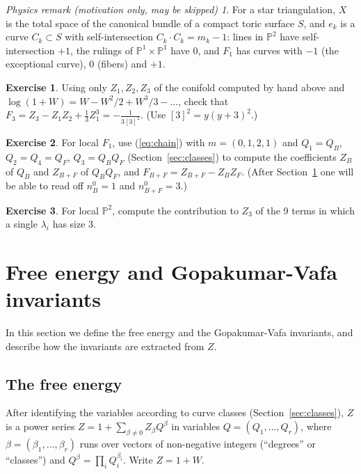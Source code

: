 \documentclass[11pt]{article}
\theoremstyle{plain}
\theoremstyle{definition}
\newtheorem{exercise}{Exercise}[section]
\theoremstyle{remark}
\newtheorem*{physrem}{Physics remark (motivation only, may be skipped)}
\newcommand{\PP}{\mathbb{P}}
\begin{document}
\begin{physrem}
For a star triangulation, $X$ is the total space of the canonical bundle of a compact toric
surface $S$, and $e_k$ is a curve $C_k\subset S$ with self-intersection $C_k\cdot C_k=m_k-1$:
lines in $\PP^2$ have self-intersection $+1$, the rulings of $\PP^1\times\PP^1$ have $0$, and
$F_1$ has curves with $-1$ (the exceptional curve), $0$ (fibers) and $+1$.
\end{physrem}

\begin{exercise}\label{ex:ex1}
Using only $Z_1,Z_2,Z_3$ of the conifold computed by hand above and $\log(1+W)=W-W^2/2+W^3/3-\ldots$,
check that $F_3=Z_3-Z_1Z_2+\frac13Z_1^3=-\frac1{3[3]^2}$. (Use $[3]^2=y(y+3)^2$.)
\end{exercise}

\begin{exercise}\label{ex:ex2}
For local $F_1$, use (\ref{eq:chain}) with $m=(0,1,2,1)$ and $Q_1=Q_B$, $Q_2=Q_4=Q_F$,
$Q_3=Q_BQ_F$ (Section~\ref{sec:classes}) to compute the coefficients $Z_B$ of $Q_B$ and $Z_{B+F}$ of
$Q_BQ_F$, and $F_{B+F}=Z_{B+F}-Z_BZ_F$. (After Section~\ref{sec:gv} one will be able to read
off $n^0_B=1$ and $n^0_{B+F}=3$.)
\end{exercise}

\begin{exercise}\label{ex:ex3}
For local $\PP^2$, compute the contribution to $Z_3$ of the 9 terms in which a single
$\lambda_i$ has size 3.
\end{exercise}

\section{Free energy and Gopakumar-Vafa invariants}\label{sec:gv}

In this section we define the free energy and the Gopakumar-Vafa invariants, and describe how
the invariants are extracted from $Z$.


\subsection{The free energy}

After identifying the variables according to curve classes (Section~\ref{sec:classes}), $Z$ is
a power series $Z=1+\sum_{\beta\ne0}Z_\beta Q^\beta$ in variables $Q=(Q_1,\ldots,Q_r)$, where
$\beta=(\beta_1,\ldots,\beta_r)$ runs over vectors of non-negative integers (``degrees'' or
``classes'') and $Q^\beta=\prod_iQ_i^{\beta_i}$. Write $Z=1+W$.
\end{document}
